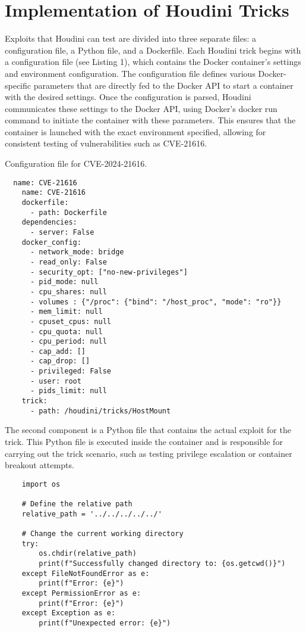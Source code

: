 \section{Implementation of Houdini Tricks}
\label{sec:implementation}

Exploits that Houdini can test are divided into three separate files: a configuration file, a Python file, and a Dockerfile. Each Houdini trick begins with a configuration file (see Listing 1), which contains the Docker container's settings and environment configuration. The configuration file defines various Docker-specific parameters that are directly fed to the Docker API to start a container with the desired settings. Once the configuration is parsed, Houdini communicates these settings to the Docker API, using Docker's docker run command to initiate the container with these parameters. This ensures that the container is launched with the exact environment specified, allowing for consistent testing of vulnerabilities such as CVE-21616.


\begin{listing}[h]
  \caption{Configuration file for CVE-2024-21616.}
  \label{lst:configuration-file}
  \begin{verbatim}
  name: CVE-21616
    name: CVE-21616
    dockerfile:
      - path: Dockerfile
    dependencies:
      - server: False
    docker_config: 
      - network_mode: bridge
      - read_only: False
      - security_opt: ["no-new-privileges"]
      - pid_mode: null
      - cpu_shares: null
      - volumes : {"/proc": {"bind": "/host_proc", "mode": "ro"}}
      - mem_limit: null
      - cpuset_cpus: null
      - cpu_quota: null
      - cpu_period: null
      - cap_add: []
      - cap_drop: []
      - privileged: False
      - user: root
      - pids_limit: null
    trick:
      - path: /houdini/tricks/HostMount
  \end{verbatim}
\end{listing}



The second component is a Python file that contains the actual exploit for the trick. This Python file is executed inside the container and is responsible for carrying out the trick scenario, such as testing privilege escalation or container breakout attempts.


\begin{listing}[h]
  \caption{}
\label{lst:pythonfile}
  \begin{verbatim}
    import os

    # Define the relative path
    relative_path = '../../../../../'

    # Change the current working directory
    try:
        os.chdir(relative_path)
        print(f"Successfully changed directory to: {os.getcwd()}")
    except FileNotFoundError as e:
        print(f"Error: {e}")
    except PermissionError as e:
        print(f"Error: {e}")
    except Exception as e:
        print(f"Unexpected error: {e}")
  \end{verbatim}
\end{listing}



